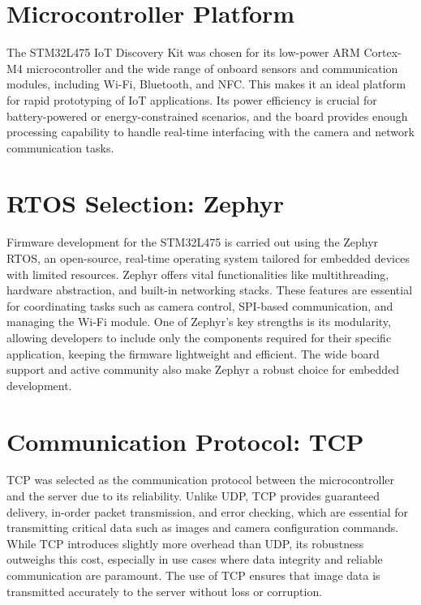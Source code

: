 \section{Microcontroller Platform}

The STM32L475 IoT Discovery Kit was chosen for its low-power ARM Cortex-M4 microcontroller and the wide range of onboard sensors and communication modules, including Wi-Fi, Bluetooth, and NFC. This makes it an ideal platform for rapid prototyping of IoT applications. Its power efficiency is crucial for battery-powered or energy-constrained scenarios, and the board provides enough processing capability to handle real-time interfacing with the camera and network communication tasks.

\section{RTOS Selection: Zephyr}

Firmware development for the STM32L475 is carried out using the Zephyr RTOS, an open-source, real-time operating system tailored for embedded devices with limited resources. Zephyr offers vital functionalities like multithreading, hardware abstraction, and built-in networking stacks. These features are essential for coordinating tasks such as camera control, SPI-based communication, and managing the Wi-Fi module. One of Zephyr’s key strengths is its modularity, allowing developers to include only the components required for their specific application, keeping the firmware lightweight and efficient. The wide board support and active community also make Zephyr a robust choice for embedded development.

\section{Communication Protocol: TCP}

TCP was selected as the communication protocol between the microcontroller and the server due to its reliability. Unlike UDP, TCP provides guaranteed delivery, in-order packet transmission, and error checking, which are essential for transmitting critical data such as images and camera configuration commands. While TCP introduces slightly more overhead than UDP, its robustness outweighs this cost, especially in use cases where data integrity and reliable communication are paramount. The use of TCP ensures that image data is transmitted accurately to the server without loss or corruption.

